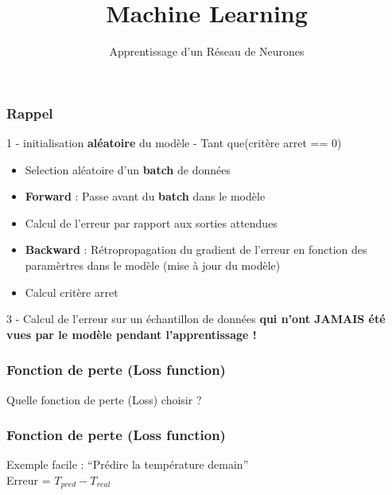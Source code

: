 \documentclass{formation}
\title{Machine Learning}
\subtitle{Apprentissage d'un Réseau de Neurones}
\begin{document}
\maketitle

\begin{frame}
  \frametitle{Rappel}
  1 - initialisation \textbf{aléatoire} du modèle
   - Tant que(critère arret == 0)
  \begin{itemize}
  \item Selection aléatoire d'un \textbf{batch} de données
  \item \textbf{Forward} : Passe avant du \textbf{batch} dans le modèle
  \item Calcul de l'erreur par rapport aux sorties attendues
  \item \textbf{Backward} : Rétropropagation du gradient de l'erreur en fonction des paramèrtres dans le modèle (mise à jour du modèle)
  \item Calcul critère arret
  \end{itemize}
  3 - Calcul de l'erreur sur un échantillon de données  \textbf{qui n'ont JAMAIS été vues par le modèle pendant l'apprentissage !}
\end{frame}

\begin{frame}
  \frametitle{Fonction de perte (\textbf{Loss} function)}
  \begin{center}
    \huge{Quelle fonction de perte (Loss) choisir ?}
  \end{center}
\end{frame}

\begin{frame}
  \frametitle{Fonction de perte (\textbf{Loss} function)}
  Exemple facile : ``Prédire la température demain'' \\
  \newline
  \newline
  Erreur = $T_{pred} - T_{real}$
\end{frame}
\end{document}
